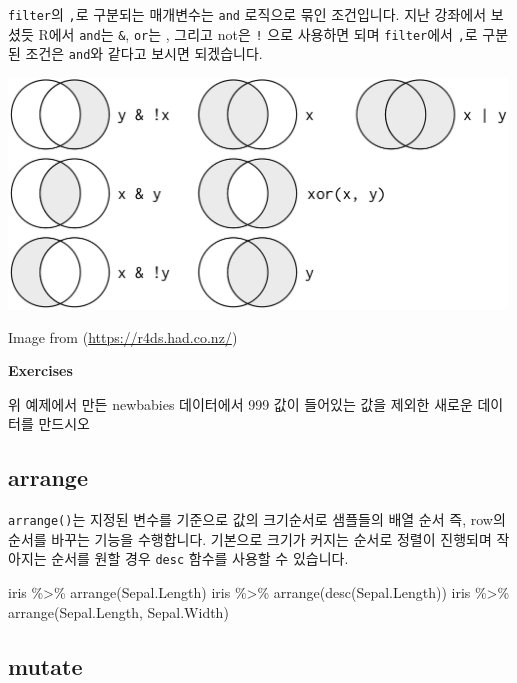 \documentclass[
]{book}
\newenvironment{Shaded}{\begin{snugshade}}{\end{snugshade}}
\newcommand{\FunctionTok}[1]{\textcolor[rgb]{0.00,0.00,0.00}{#1}}
\newcommand{\NormalTok}[1]{#1}
\newcommand{\SpecialCharTok}[1]{\textcolor[rgb]{0.00,0.00,0.00}{#1}}
\begin{document}
\texttt{filter}의 \texttt{,}로 구분되는 매개변수는 \texttt{and} 로직으로 묶인 조건입니다. 지난 강좌에서 보셨듯 R에서 \texttt{and}는 \texttt{\&}, \texttt{or}는 \texttt{\textbar{}}, 그리고 not은 \texttt{!} 으로 사용하면 되며 \texttt{filter}에서 \texttt{,}로 구분된 조건은 \texttt{and}와 같다고 보시면 되겠습니다.

\includegraphics[width=5.20833in,height=\textheight]{images/07/03.png}

Image from (\url{https://r4ds.had.co.nz/})

\textbf{Exercises}

위 예제에서 만든 newbabies 데이터에서 999 값이 들어있는 값을 제외한 새로운 데이터를 만드시오

\hypertarget{arrange}{%
\subsection{arrange}\label{arrange}}

\texttt{arrange()}는 지정된 변수를 기준으로 값의 크기순서로 샘플들의 배열 순서 즉, row의 순서를 바꾸는 기능을 수행합니다. 기본으로 크기가 커지는 순서로 정렬이 진행되며 작아지는 순서를 원할 경우 \texttt{desc} 함수를 사용할 수 있습니다.

\begin{Shaded}
\begin{Highlighting}[]
\NormalTok{iris }\SpecialCharTok{\%\textgreater{}\%} \FunctionTok{arrange}\NormalTok{(Sepal.Length)}
\NormalTok{iris }\SpecialCharTok{\%\textgreater{}\%} \FunctionTok{arrange}\NormalTok{(}\FunctionTok{desc}\NormalTok{(Sepal.Length))}
\NormalTok{iris }\SpecialCharTok{\%\textgreater{}\%} \FunctionTok{arrange}\NormalTok{(Sepal.Length, Sepal.Width)}
\end{Highlighting}
\end{Shaded}

\hypertarget{mutate}{%
\subsection{mutate}\label{mutate}}
\end{document}
